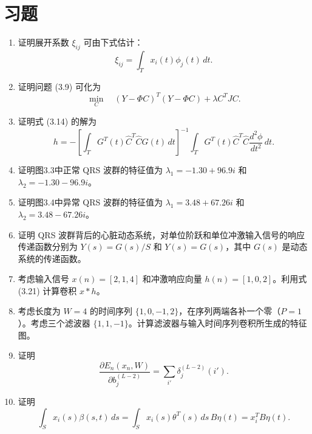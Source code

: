 \clearpage
\section*{习题}
\begin{enumerate}[label=\textbf{习题\arabic*.},leftmargin=4.2em]
\item 证明展开系数 $\xi_{ij}$ 可由下式估计：
\[
\xi_{ij}=\int_Tx_i(t)\phi_j(t)\,dt.
\]
\item 证明问题 (3.9) 可化为
\[
\min_C\quad(Y-\Phi C)^T(Y-\Phi C)+\lambda C^TJC.
\]
\item 证明式 (3.14) 的解为
\[
h=-\left[\int_TG^T(t)\hat C^T\hat CG(t)\,dt\right]^{-1}
\int_TG^T(t)\hat C^T\hat C\frac{d^2\phi}{dt^2}\,dt.
\]
\item 证明图3.3中正常 QRS 波群的特征值为 $\lambda_1=-1.30+96.9i$ 和 $\lambda_2=-1.30-96.9i$。
\item 证明图3.4中异常 QRS 波群的特征值为 $\lambda_1=3.48+67.26i$ 和 $\lambda_2=3.48-67.26i$。
\item 证明 QRS 波群背后的心脏动态系统，对单位阶跃和单位冲激输入信号的响应传递函数分别为 $Y(s)=G(s)/S$ 和 $Y(s)=G(s)$，其中 $G(s)$ 是动态系统的传递函数。
\item 考虑输入信号 $x(n)=[2,1,4]$ 和冲激响应向量 $h(n)=[1,0,2]$。利用式 (3.21) 计算卷积 $x*h$。
\item 考虑长度为 $W=4$ 的时间序列 $\{1,0,-1,2\}$，在序列两端各补一个零（$P=1$）。考虑三个滤波器 $\{1,1,-1\}$。计算滤波器与输入时间序列卷积所生成的特征图。
\item 证明
\[
\frac{\partial E_n(x_n,W)}{\partial b_j^{(L-2)}}=\sum_{i'}\delta_j^{(L-2)}(i').
\]
\item 证明
\[
\int_Sx_i(s)\beta(s,t)\,ds
=\int_Sx_i(s)\theta^T(s)\,ds\,B\eta(t)
=x_i^TB\eta(t).
\]
\end{enumerate}
